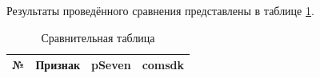 Результаты проведённого сравнения представлены в таблице \ref{rndhpcblo.0209}.

\begin{landscape}
  \begin{longtable}{|c|p{}|p{}|p{}|}
    \caption{Сравнительная таблица}\label{rndhpcblo.0209}                                                                                                                                                                                                                                                                                                                                                                                                                                                                                                                                                                                                                                                                                                                                                                                                                                                                                                                                                                                                           \\
    \hline
    \textbf{№} & \textbf{Признак}                                                                           & \textbf{pSeven}                                                                                                                                                                                                                                                                                                                                                                                                                                                                                                                                                                                                                                                   & \textbf{comsdk}                                                                                                                                                                                                                                                                   \\
    \hline

\end{longtable}
\end{landscape}
